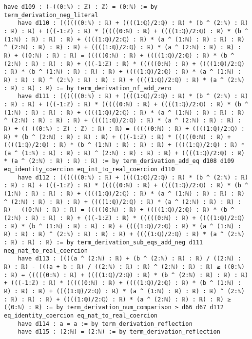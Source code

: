 \documentclass{article}
\begin{document}
\begin{tcolorbox}[colback=white!10, width=\linewidth]
\begin{lstlisting}[language=Lean4]
    have d109 : (-((0:ℕ) : ℤ) : ℤ) = (0:ℕ) := by term_derivation_neg_literal
    have d110 : ((((((0:ℕ) : ℝ) + ((((1:ℚ)/2:ℚ) : ℝ) * (b ^ (2:ℕ) : ℝ) : ℝ) : ℝ) + (((-1:ℤ) : ℝ) * (((((0:ℕ) : ℝ) + ((((1:ℚ)/2:ℚ) : ℝ) * (b ^ (1:ℕ) : ℝ) : ℝ) : ℝ) + ((((1:ℚ)/2:ℚ) : ℝ) * (a ^ (1:ℕ) : ℝ) : ℝ) : ℝ) ^ (2:ℕ) : ℝ) : ℝ) : ℝ) + ((((1:ℚ)/2:ℚ) : ℝ) * (a ^ (2:ℕ) : ℝ) : ℝ) : ℝ) + ((0:ℕ) : ℝ) : ℝ) = (((((0:ℕ) : ℝ) + ((((1:ℚ)/2:ℚ) : ℝ) * (b ^ (2:ℕ) : ℝ) : ℝ) : ℝ) + (((-1:ℤ) : ℝ) * (((((0:ℕ) : ℝ) + ((((1:ℚ)/2:ℚ) : ℝ) * (b ^ (1:ℕ) : ℝ) : ℝ) : ℝ) + ((((1:ℚ)/2:ℚ) : ℝ) * (a ^ (1:ℕ) : ℝ) : ℝ) : ℝ) ^ (2:ℕ) : ℝ) : ℝ) : ℝ) + ((((1:ℚ)/2:ℚ) : ℝ) * (a ^ (2:ℕ) : ℝ) : ℝ) : ℝ) := by term_derivation_nf_add_zero
    have d111 : ((((((0:ℕ) : ℝ) + ((((1:ℚ)/2:ℚ) : ℝ) * (b ^ (2:ℕ) : ℝ) : ℝ) : ℝ) + (((-1:ℤ) : ℝ) * (((((0:ℕ) : ℝ) + ((((1:ℚ)/2:ℚ) : ℝ) * (b ^ (1:ℕ) : ℝ) : ℝ) : ℝ) + ((((1:ℚ)/2:ℚ) : ℝ) * (a ^ (1:ℕ) : ℝ) : ℝ) : ℝ) ^ (2:ℕ) : ℝ) : ℝ) : ℝ) + ((((1:ℚ)/2:ℚ) : ℝ) * (a ^ (2:ℕ) : ℝ) : ℝ) : ℝ) + ((-((0:ℕ) : ℤ) : ℤ) : ℝ) : ℝ) = (((((0:ℕ) : ℝ) + ((((1:ℚ)/2:ℚ) : ℝ) * (b ^ (2:ℕ) : ℝ) : ℝ) : ℝ) + (((-1:ℤ) : ℝ) * (((((0:ℕ) : ℝ) + ((((1:ℚ)/2:ℚ) : ℝ) * (b ^ (1:ℕ) : ℝ) : ℝ) : ℝ) + ((((1:ℚ)/2:ℚ) : ℝ) * (a ^ (1:ℕ) : ℝ) : ℝ) : ℝ) ^ (2:ℕ) : ℝ) : ℝ) : ℝ) + ((((1:ℚ)/2:ℚ) : ℝ) * (a ^ (2:ℕ) : ℝ) : ℝ) : ℝ) := by term_derivation_add_eq d108 d109 eq_identity_coercion eq_int_to_real_coercion d110
    have d112 : ((((((0:ℕ) : ℝ) + ((((1:ℚ)/2:ℚ) : ℝ) * (b ^ (2:ℕ) : ℝ) : ℝ) : ℝ) + (((-1:ℤ) : ℝ) * (((((0:ℕ) : ℝ) + ((((1:ℚ)/2:ℚ) : ℝ) * (b ^ (1:ℕ) : ℝ) : ℝ) : ℝ) + ((((1:ℚ)/2:ℚ) : ℝ) * (a ^ (1:ℕ) : ℝ) : ℝ) : ℝ) ^ (2:ℕ) : ℝ) : ℝ) : ℝ) + ((((1:ℚ)/2:ℚ) : ℝ) * (a ^ (2:ℕ) : ℝ) : ℝ) : ℝ) - ((0:ℕ) : ℝ) : ℝ) = (((((0:ℕ) : ℝ) + ((((1:ℚ)/2:ℚ) : ℝ) * (b ^ (2:ℕ) : ℝ) : ℝ) : ℝ) + (((-1:ℤ) : ℝ) * (((((0:ℕ) : ℝ) + ((((1:ℚ)/2:ℚ) : ℝ) * (b ^ (1:ℕ) : ℝ) : ℝ) : ℝ) + ((((1:ℚ)/2:ℚ) : ℝ) * (a ^ (1:ℕ) : ℝ) : ℝ) : ℝ) ^ (2:ℕ) : ℝ) : ℝ) : ℝ) + ((((1:ℚ)/2:ℚ) : ℝ) * (a ^ (2:ℕ) : ℝ) : ℝ) : ℝ) := by term_derivation_sub_eqs_add_neg d111 neg_nat_to_real_coercion
    have d113 : ((((a ^ (2:ℕ) : ℝ) + (b ^ (2:ℕ) : ℝ) : ℝ) / ((2:ℕ) : ℝ) : ℝ) - (((a + b : ℝ) / ((2:ℕ) : ℝ) : ℝ) ^ (2:ℕ) : ℝ) : ℝ) ≥ ((0:ℕ) : ℝ) ↔ (((((0:ℕ) : ℝ) + ((((1:ℚ)/2:ℚ) : ℝ) * (b ^ (2:ℕ) : ℝ) : ℝ) : ℝ) + (((-1:ℤ) : ℝ) * (((((0:ℕ) : ℝ) + ((((1:ℚ)/2:ℚ) : ℝ) * (b ^ (1:ℕ) : ℝ) : ℝ) : ℝ) + ((((1:ℚ)/2:ℚ) : ℝ) * (a ^ (1:ℕ) : ℝ) : ℝ) : ℝ) ^ (2:ℕ) : ℝ) : ℝ) : ℝ) + ((((1:ℚ)/2:ℚ) : ℝ) * (a ^ (2:ℕ) : ℝ) : ℝ) : ℝ) ≥ ((0:ℕ) : ℝ) := by term_derivation_num_comparison ≥ d66 d67 d112 eq_identity_coercion eq_nat_to_real_coercion
    have d114 : a = a := by term_derivation_reflection
    have d115 : (2:ℕ) = (2:ℕ) := by term_derivation_reflection

\end{lstlisting}
\end{tcolorbox}
\end{document}
